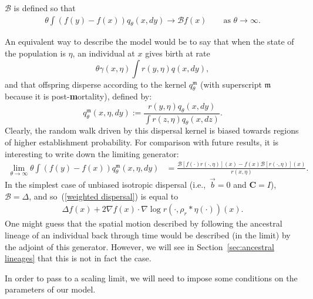 \documentclass[EJP]{ejpecp} %
\newcommand{\grad}{\nabla}
\newcommand{\DG}{\mathcal{B}}  %
\newcommand{\meanq}{\vec b}    %
\newcommand{\covq}{\mathbf{C}}     %
\newcommand{\kernel}{\rho}  %
\newcommand{\smooth}[1]{\kernel_{#1} \! * \!}  %
\begin{document}
\begin{remark}
    \label{rem:DG_limit}
    $\DG$ is defined so that
    \begin{align*}
        \theta \int \left(
            f(y) - f(x)
        \right) q_\theta(x, dy)
    \to \DG f(x) 
        \qquad \text{as } \theta \to \infty .
    \end{align*}
\end{remark}

\begin{remark}
\label{ancestral lineages: first guess}
An equivalent way to describe the model would be to say that
when the state of the population is $\eta$,
an individual at $x$ gives birth at rate
$$
    \theta \gamma(x, \eta)
    \int r(y, \eta) q(x, dy) ,
$$
and that offspring disperse according to the kernel
$q_\theta^\mathfrak{m}$ (with superscript $\mathfrak{m}$ because it is post-\textbf{m}ortality),
defined by: 
$$
    q_\theta^\mathfrak{m}(x,\eta,dy)
    :=
    \frac{
        r(y, \eta) q_\theta(x, dy)
    }{
        \int r(z, \eta) q_\theta(x, dz)
    } .
$$
Clearly, the random walk driven by this dispersal kernel
is biased towards regions of higher establishment probability.
For comparison with future results,
it is interesting to write down the limiting generator:
\begin{align}
	\label{weighted dispersal}
    \lim_{\theta \to \infty}
    \theta \int (f(y) - f(x)) q_\theta^\mathfrak{m}(x, \eta, dy)
    &=
    \frac{
        \DG\left[ f(\cdot) r(\cdot, \eta) \right](x)
        - 
        f(x) \DG\left[ r(\cdot, \eta) \right](x)
    }{
        r(x, \eta)
    } .
\end{align}
In the simplest case of unbiased isotropic dispersal
(i.e.,~$\meanq = 0$ and $\covq = I$), $\DG = \Delta$,
and so~(\ref{weighted dispersal}) is equal to
\begin{align*}
    \Delta f(x) + 2 \grad f(x) \cdot \grad \log r(\cdot, \smooth{r} \eta(\cdot))(x) .
\end{align*}
One might guess that the spatial motion described by following  
the ancestral lineage of an individual 
back through time
would be described (in the limit) by the adjoint of this generator.
However, we will see in Section~\ref{sec:ancestral lineages}
that this is not in fact the case.
\end{remark}

In order to pass to a scaling limit, we will need to impose some 
conditions on the parameters of our model.
\end{document}

